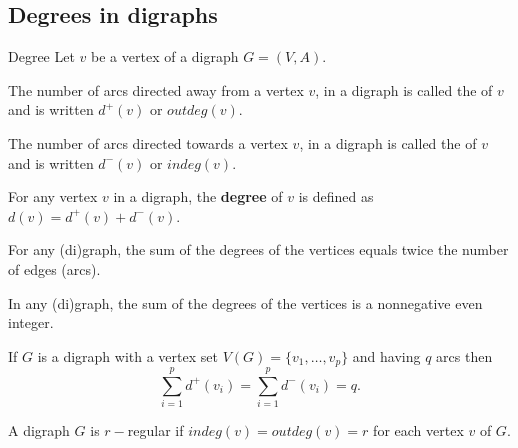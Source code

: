 \documentclass[aspectratio=169]{beamer}
\begin{document}
\subsection{Degrees in digraphs}
\begin{frame}{Degree}
	Let $v$ be a vertex of a digraph $G=(V,A)$.
	\begin{definition}
	The number of arcs directed away from a vertex $v$, in a digraph is called the  of $v$ and is written $d^+(v)$ or $outdeg(v)$.
	\end{definition}
	\begin{definition}
	The number of arcs directed towards a vertex $v$, in a digraph is called the  of $v$ and is written $d^-(v)$ or $indeg(v)$.
	\end{definition}
	\begin{definition}[{Degree}]
	For any vertex $v$ in a digraph, the \textbf{degree} of $v$ is defined as $d(v)=d^+(v)+d^-(v)$.
	\end{definition}
\end{frame}



\begin{frame}
	\begin{theorem}
		For any (di)graph, the sum of the degrees of the vertices equals twice the number of edges (arcs).
	\end{theorem}
	\begin{corollary}
		In any (di)graph, the sum of the degrees of the vertices is a nonnegative even integer.
	\end{corollary}
	\begin{theorem}
		If $G$ is a digraph with a vertex set $V(G)=\{v_1, \dots , v_p\}$ and having $q$ arcs then $$\sum_{i=1}^p d^+(v_i)=\sum_{i=1}^p d^-(v_i)=q.$$
	\end{theorem}
\end{frame}

\begin{frame}
	\begin{definition}
		A digraph $G$ is $r-$regular if $indeg(v)=outdeg(v)=r$ for each vertex $v$ of $G$.
\end{definition}\end{frame}



\end{document}
